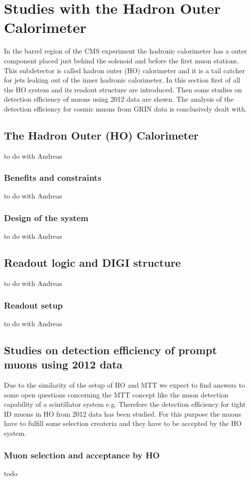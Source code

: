 \section{Studies with the Hadron Outer Calorimeter}
In the barrel region of the CMS experiment the hadronic calorimeter has a outer component placed just behind the solenoid and before the first muon stations. This subdetector is called hadron outer
(HO) calorimeter and it is a tail catcher for jets leaking out of the inner hadronic calorimeter. In this section first of all the HO system and its readout structure are introduced. Then some studies
on detection efficiency of muons using 2012 data are shown. The analysis of the detection efficiency for cosmic muons from GRIN data is conclusively dealt with.
	\subsection{The Hadron Outer (HO) Calorimeter}
		to do with Andreas
  		\subsubsection{Benefits and constraints}
			to do with Andreas
  		\subsubsection{Design of the system}
			to do with Andreas
	\subsection{Readout logic and DIGI structure}
		to do with Andreas
  		\subsubsection{Readout setup}
			to do with Andreas
	\subsection{Studies on detection efficiency of prompt muons using 2012 data}
		Due to the similarity of the setup of HO and MTT we expect to find answers to some open questions concerning the MTT concept like the muon detection capability of a
		scintillator system e.g. Therefore the detection efficiency for tight ID muons in HO from 2012 data has been studied. For this purpose the muons have to fulfill some selection createria and they
		have to be accepted by the HO system.
		\subsubsection{Muon selection and acceptance by HO}
			todo
